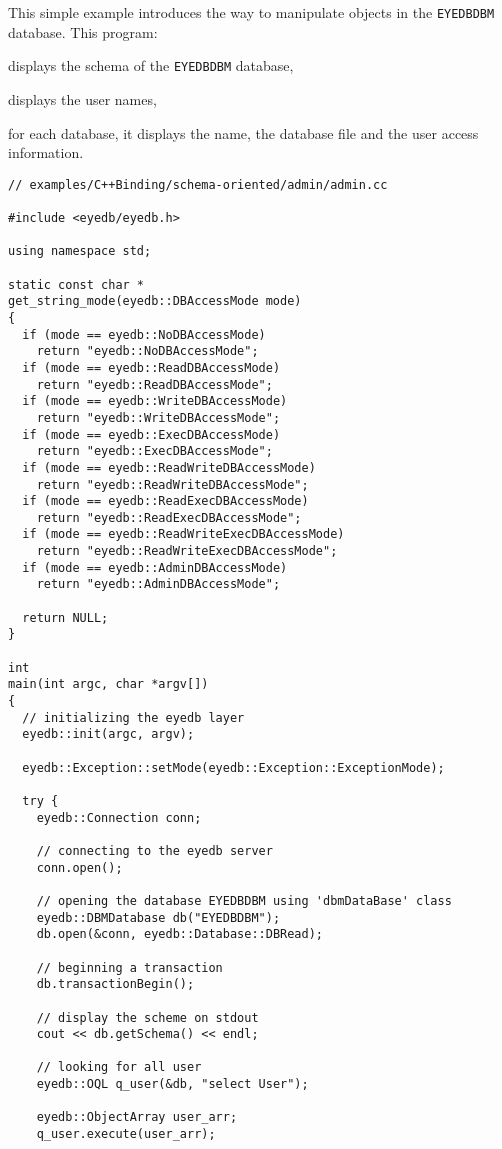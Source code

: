 This simple example introduces the way to manipulate objects in the
\texttt{EYEDBDBM} database. This program:
\be
\item displays the schema of the \texttt{EYEDBDBM} database,
\item displays the \eyedb user names,
\item for each database, it displays the name, the database file and
the user access information.
\ee
\verbsize
\begin{verbatim}
// examples/C++Binding/schema-oriented/admin/admin.cc

#include <eyedb/eyedb.h>

using namespace std;

static const char *
get_string_mode(eyedb::DBAccessMode mode)
{
  if (mode == eyedb::NoDBAccessMode)
    return "eyedb::NoDBAccessMode";
  if (mode == eyedb::ReadDBAccessMode)
    return "eyedb::ReadDBAccessMode";
  if (mode == eyedb::WriteDBAccessMode)
    return "eyedb::WriteDBAccessMode";
  if (mode == eyedb::ExecDBAccessMode)
    return "eyedb::ExecDBAccessMode";
  if (mode == eyedb::ReadWriteDBAccessMode)
    return "eyedb::ReadWriteDBAccessMode";
  if (mode == eyedb::ReadExecDBAccessMode)
    return "eyedb::ReadExecDBAccessMode";
  if (mode == eyedb::ReadWriteExecDBAccessMode)
    return "eyedb::ReadWriteExecDBAccessMode";
  if (mode == eyedb::AdminDBAccessMode)
    return "eyedb::AdminDBAccessMode";

  return NULL;
}

int
main(int argc, char *argv[])
{
  // initializing the eyedb layer
  eyedb::init(argc, argv);

  eyedb::Exception::setMode(eyedb::Exception::ExceptionMode);

  try {
    eyedb::Connection conn;

    // connecting to the eyedb server
    conn.open();

    // opening the database EYEDBDBM using 'dbmDataBase' class
    eyedb::DBMDatabase db("EYEDBDBM");
    db.open(&conn, eyedb::Database::DBRead);

    // beginning a transaction
    db.transactionBegin();

    // display the scheme on stdout
    cout << db.getSchema() << endl;

    // looking for all user
    eyedb::OQL q_user(&db, "select User");

    eyedb::ObjectArray user_arr;
    q_user.execute(user_arr);


\end{verbatim}
